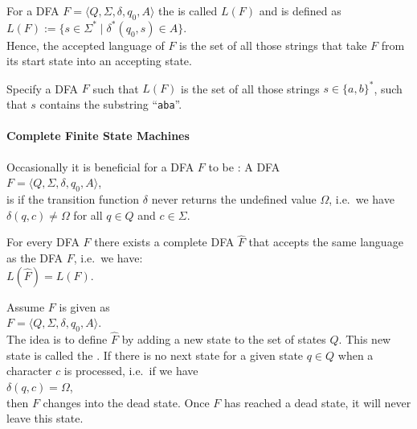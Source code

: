 \begin{Definition}
   
  For a \textsc{DFA} $F = \langle Q, \Sigma, \delta, q_0, A \rangle$ the  
  is called $L(F)$ and is defined as
  \\[0.2cm]
  \hspace*{1.3cm}
  $L(F) := \bigl\{ s \in \Sigma^* \mid \delta^*(q_0,s) \in A \bigr\}$. 
  \\[0.2cm]
  Hence, the accepted language of $F$ is the set of all those strings that take $F$ from its
  start state into an accepting state. \eox
\end{Definition}

\exerciseEng
Specify a \textsc{DFA} $F$ such that $L(F)$ is the set of all those strings $s \in \{a,b\}^*$, 
such that $s$ contains the substring  ``\texttt{aba}''.
\eox


\paragraph{Complete Finite State Machines}
Occasionally it is beneficial for a \textsc{DFA} $F$ to be : A \textsc{DFA}
\\[0.2cm]
\hspace*{1.3cm}
$F = \langle Q, \Sigma, \delta, q_0, A \rangle$,
\\[0.2cm]
is  if the transition function $\delta$ never returns the
undefined value $\Omega$, i.e.~we have 
\\[0.2cm]
\hspace*{1.3cm}
$\delta(q, c) \not= \Omega$ \quad for all $q \in Q$ and $c \in \Sigma$.

\begin{Proposition}
  For every \textsc{DFA} $F$ there exists a complete \textsc{DFA}  $\widehat{F}$ that accepts
  the same language as the \textsc{DFA}  $F$, i.e.~we have:
  \\[0.2cm]
  \hspace*{1.3cm}
  $L(\widehat{F}) = L(F)$.
\end{Proposition}

\proofEng
Assume $F$ is given as
\\[0.2cm]
\hspace*{1.3cm}
$F = \langle Q, \Sigma, \delta, q_0, A \rangle$.
\\[0.2cm]
The idea is to define $\widehat{F}$ by adding a new state to the set of states $Q$.  This new state is called
the  .  If there is no next state for a given state  $q \in Q$ when a character $c$
is processed, i.e.~if we have
\\[0.2cm]
\hspace*{1.3cm}
$\delta(q, c) = \Omega$,
\\[0.2cm]
then $F$ changes into the dead state.  Once $F$ has reached a dead state, it will never leave this
state.

